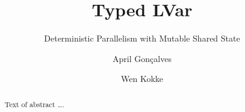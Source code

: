\documentclass[sigplan,10pt,review,anonymous]{acmart}
\newcommand{\onlyinsubfile}[1]{#1}
\newcommand{\notinsubfile}[1]{}
\begin{document}
\renewcommand{\onlyinsubfile}[1]{}
\renewcommand{\notinsubfile}[1]{#1}



\title{Typed LVar}
\subtitle{Deterministic Parallelism with Mutable Shared State}


\author{April Gon\c{c}alves}

\author{Wen Kokke}

\begin{abstract}
Text of abstract \ldots.
\end{abstract}

\begin{CCSXML}
\end{CCSXML}
\end{document}
